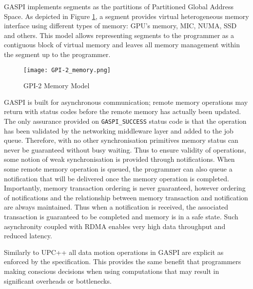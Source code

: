GASPI implements segments as the partitions of Partitioned Global Address Space. As depicted in Figure \ref{fig:GPI-2_Diagram}, a segment provides virtual heterogeneous memory interface using different types of memory: GPU's memory, MIC, NUMA, SSD and others. This model allows representing segments to the programmer as a contiguous block of virtual memory and leaves all memory management within the segment up to the programmer. 

\begin{figure}
    \centering
    \texttt{[image: GPI-2\_memory.png]}
    \caption{GPI-2 Memory Model \cite{GPI-2_Documentation}}
    \label{fig:GPI-2_Diagram}
\end{figure}

GASPI is built for asynchronous communication; remote memory operations may return with status codes before the remote memory has actually been updated. The only assurance provided on \verb|GASPI_SUCCESS| status code is that the operation has been validated by the networking middleware layer and added to the job queue. Therefore, with no other synchronisation primitives memory status can never be guaranteed without busy waiting.
Thus to ensure validity of operations, some notion of weak synchronisation is provided through notifications. When some remote memory operation is queued, the programmer can also queue a notification that will be delivered once the memory operation is completed. Importantly, memory transaction ordering is never guaranteed, however ordering of notifications and the relationship between memory transaction and notification are always maintained. Thus when a notification is received, the associated transaction is guaranteed to be completed and memory is in a safe state. Such asynchronity coupled with RDMA enables very high data throughput and reduced latency. 

Similarly to UPC++ all data motion operations in GASPI are explicit as enforced by the specification. This provides the same benefit that programmers making conscious decisions when using computations that may result in significant overheads or bottlenecks. 

